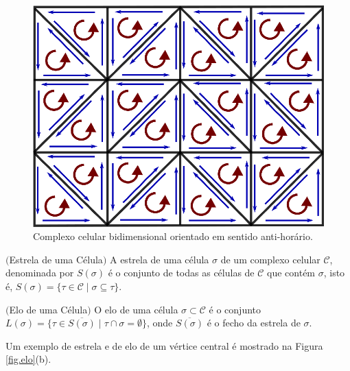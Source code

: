\begin{figure}[h]
\begin{center} 
\includegraphics[angle=0,scale=0.7]{imagens/cap2/fig3.eps}
\caption{Complexo celular bidimensional orientado em sentido anti-horário.} 
\label{fig.orientacao}
\end{center}
\end{figure}


\begin{defi} $($Estrela de uma Célula$)$
A estrela de uma célula $\sigma$ de um complexo celular $\mathcal{C}$, denominada por $S(\sigma)$ é o conjunto de todas as células de $\mathcal{C}$ que contém $\sigma$, isto é, $S(\sigma) = \{ \tau \in \mathcal{C} \; | \; \sigma \subseteq \tau \}$.
\end{defi}

\begin{defi} $($Elo de uma Célula$)$
O elo de uma célula $\sigma \subset \mathcal{C}$ é o conjunto $L(\sigma) = \{ \tau \in \overline{S(\sigma)} \; | \; \tau \cap \sigma = \emptyset \}$, onde $\overline{S(\sigma)}$ é o fecho da estrela de $\sigma$.
\end{defi}

Um exemplo de estrela e de elo de um vértice central é mostrado na Figura \ref{fig.elo}(b). 

